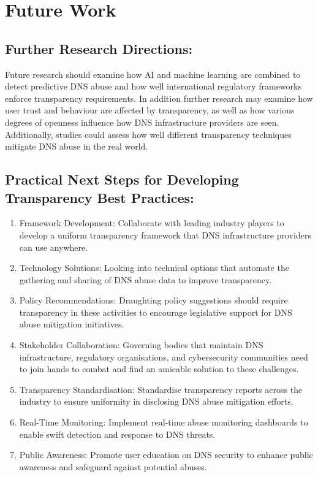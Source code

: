 \section{Future Work}



\subsection{Further Research Directions:} Future research should examine how AI and machine learning are combined to detect predictive DNS abuse and how well international regulatory frameworks enforce transparency requirements. In addition further research may examine how user trust and behaviour are affected by transparency, as well as how various degrees of openness influence how DNS infrastructure providers are seen. Additionally, studies could assess how well different transparency techniques mitigate DNS abuse in the real world.

\subsection{Practical Next Steps for Developing Transparency Best Practices: }

\begin{enumerate}
    \item Framework Development: Collaborate with leading industry players to develop a uniform transparency framework that DNS infrastructure providers can use anywhere.

    \item Technology Solutions: Looking into technical options that automate the gathering and sharing of DNS abuse data to improve transparency.

    \item Policy Recommendations: Draughting policy suggestions should require transparency in these activities to encourage legislative support for DNS abuse mitigation initiatives.
    
    \item Stakeholder Collaboration: Governing bodies that maintain DNS infrastructure, regulatory organisations, and cybersecurity communities need to join hands to combat and find an amicable solution to these challenges.
    
    \item Transparency Standardisation: Standardise transparency reports across the industry to ensure uniformity in disclosing DNS abuse mitigation efforts.
    \item Real-Time Monitoring: Implement real-time abuse monitoring dashboards to enable swift detection and response to DNS threats.
    \item  Public Awareness: Promote user education on DNS security to enhance public awareness and safeguard against potential abuses.
\end{enumerate}


